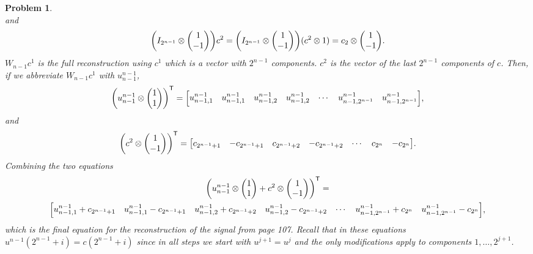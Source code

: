 \documentclass{article}
\newcommand{\T}{\mathsf{T}}
\theoremstyle{pprop}
\newtheorem{problem}{Problem}[section]
\begin{document}
\begin{problem}
\[\]
and
\[
\qty(I_{2^{n-1}} \otimes \mqty(1 \\ -1)) c^2 = \qty(I_{2^{n-1}} \otimes \mqty(1 \\ -1)) (c^2 \otimes 1) = c_2 \otimes \mqty(1 \\ -1). 
\]
$W_{n-1} c^1$ is the full reconstruction using $c^1$ which is a vector with $2^{n-1}$ components. $c^2$ is the vector of the last 
$2^{n-1}$ components of $c$. Then, if we abbreviate $W_{n-1} c^1$ with $u^{n-1}_{n-1}$, 
\begin{equation*}
\qty(u^{n-1}_{n-1}\otimes \mqty(1 \\ 1))^\T = 
\mqty[u^{n-1}_{n-1,1} & u^{n-1}_{n-1,1} & u^{n-1}_{n-1,2} & u^{n-1}_{n-1,2} & \cdots & u^{n-1}_{n-1,2^{n-1}} & u^{n-1}_{n-1,2^{n-1}}],
\end{equation*}
and 
\begin{equation*}
\qty(c^2 \otimes \mqty(1 \\ -1))^\T = 
\mqty[c_{2^{n-1}+1} & -c_{2^{n-1}+1} & c_{2^{n-1}+2} & -c_{2^{n-1}+2} & \cdots & c_{2^{n}} & -c_{2^{n}} ].
\end{equation*}
Combining the two equations 
{\fontsize{7pt}{8pt}\selectfont
\begin{multline*}
\qty(u^{n-1}_{n-1}\otimes \mqty(1 \\ 1)+c^2 \otimes \mqty(1 \\ -1) )^\T = \\
\mqty[u^{n-1}_{n-1,1}+c_{2^{n-1}+1} & u^{n-1}_{n-1,1}-c_{2^{n-1}+1} & u^{n-1}_{n-1,2}+c_{2^{n-1}+2} & u^{n-1}_{n-1,2}-c_{2^{n-1}+2}   & \cdots & u^{n-1}_{n-1,2^{n-1}}+c_{2^{n}} & u^{n-1}_{n-1,2^{n-1}}-c_{2^{n}} ],
\end{multline*} }
which is the final equation for the reconstruction of the signal from page 107. Recall that in these equations $u^{n-1}(2^{n-1}+i)=c(2^{n-1}+i)$ since in all steps we start with 
$u^{j+1}=u^j$ and the only modifications apply to components $1,\ldots,2^{j+1}$.


\end{problem}
\end{document}
